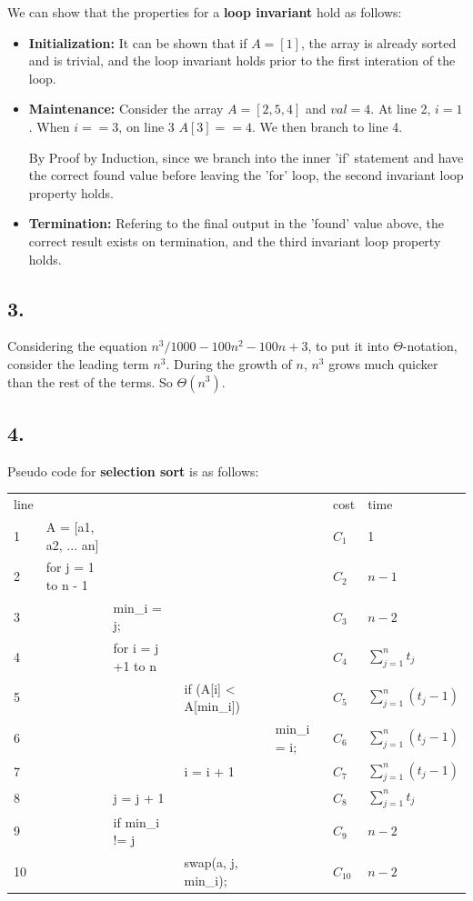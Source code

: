 \documentclass[11pt,letterpaper]{article}
\begin{document}
We can show that the properties for a \textbf{loop invariant} hold as follows:
\begin{itemize}
	\item \textbf{Initialization:}	It can be shown that if $ A = [1] $, the array is already sorted and is trivial,
							and the loop invariant holds prior to the first interation of the loop.

	\item \textbf{Maintenance:} 	Consider the array $ A = [2,5,4] $ and $val = 4$. At line 2, $i = 1$. When
							 $i == 3$, on line 3 $ A[3] == 4 $. We then branch to line 4. 

							By Proof by Induction, since we branch into the inner 'if' statement and
							have the correct found value before leaving the 'for' loop, 
							the second invariant loop property holds.

	\item \textbf{Termination:}	Refering to the final output in the 'found' value above, the correct result
							exists on termination, and the third invariant loop property holds.
\end{itemize}


\subsection*{3.}
Considering the equation $ n^3 /  1000 - 100n^2 - 100n + 3 $, to put it into $ \Theta $-notation,
consider the leading term $ n^3 $. During the growth of $ n $, $ n ^ 3 $ grows much quicker than the rest
of the terms. So $ \Theta (n^3) $.

\pagebreak

\subsection*{4.}
Pseudo code for \textbf{selection sort} is as follows:

\scriptsize
\begin{tabular}{ l l l l l l l } 
line&	&&&						& cost	&	time \\
1&	A = [a1, a2, ... an]	&&&			& $C_1 $	&	1	\\
2&	for j = 1 to n - 1	&&&			& $C_2 $	&	$ n -1  $	\\
3&	&	min\_i = j;	&&			& $C_3 $	&	$ n - 2 $	\\
4&	&	for i = j +1 to n &&			& $C_4 $	&	$ \sum_{j=1}^{n} t_j $ \\
5&	&	&	if (A[i] < A[min\_i])	&	& $C_5 $	&	$ \sum_{j=1}^{n} (t_j - 1) $	\\
6&	&	&	&	min\_i = i;		& $C_6 $	&	$ \sum_{j=1}^{n} (t_j - 1) $	\\
7&	&	& 	i = i + 1 			&	& $C_7 $	&	$ \sum_{j=1}^{n} (t_j - 1) $	\\
8&	&	j = j + 1		&&		  	& $C_8 $	&	$ \sum_{j=1}^{n} t_j $		\\
9&	&	if min\_i != j	&&			& $C_9 $	&	$ n - 2 $	\\
10&	&	&	swap(a, j, min\_i); 	&	& $C_{10} $&	$ n - 2 $	\\
\end{tabular} \\
\normalsize
\end{document}
